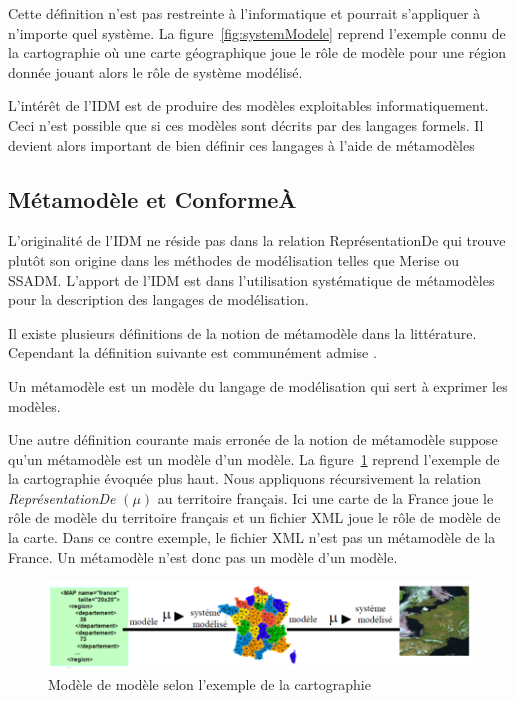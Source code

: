 Cette définition n'est pas restreinte à l'informatique et pourrait s'appliquer à 
n'importe quel système. 
La figure~\ref{fig:systemModele} reprend l'exemple connu de la cartographie où 
une carte géographique joue le rôle de modèle pour une région donnée jouant 
alors le rôle de système modélisé. 

L'intérêt de l'IDM est de produire des modèles exploitables informatiquement. 
Ceci n'est possible que si ces modèles sont décrits par des langages formels. Il 
devient alors important de bien définir ces langages à l'aide de métamodèles

\subsection{Métamodèle et ConformeÀ}
L'originalité de l'IDM ne réside pas dans la relation ReprésentationDe qui 
trouve plutôt son origine dans les méthodes de modélisation telles que Merise ou 
SSADM. L'apport de l'IDM est dans l'utilisation systématique de métamodèles pour 
la description des langages de modélisation. 

Il existe plusieurs définitions de la notion de métamodèle dans la littérature. 
Cependant la définition suivante est communément admise 
\cite{bezivin2004rapport}.

\begin{definition}
Un métamodèle est un modèle du langage de modélisation qui sert à exprimer les 
modèles.
\end{definition}
Une autre définition courante mais erronée de la notion de métamodèle suppose 
qu'un métamodèle est un modèle d'un modèle. La figure~\ref{fig:modelofmodel} 
reprend l'exemple de la cartographie évoquée plus haut. Nous appliquons 
récursivement la relation \textit{ReprésentationDe} $(\mu)$ au territoire 
français. Ici une carte de la France joue le rôle de modèle du territoire 
français et un fichier XML joue le rôle de modèle de la carte. Dans ce contre 
exemple, le fichier XML n'est pas un métamodèle de la France. Un métamodèle 
n'est donc pas un modèle d'un modèle.

\begin{figure}[!htbp]
 \begin{center}
  \includegraphics[width=1\textwidth]{images/Chapitre1/modelofmodel.png}
 \end{center}
 \caption{Modèle de modèle selon l'exemple de la cartographie 
\protect\cite{favre2006ingenierie}}
 \label{fig:modelofmodel}
\end{figure}

